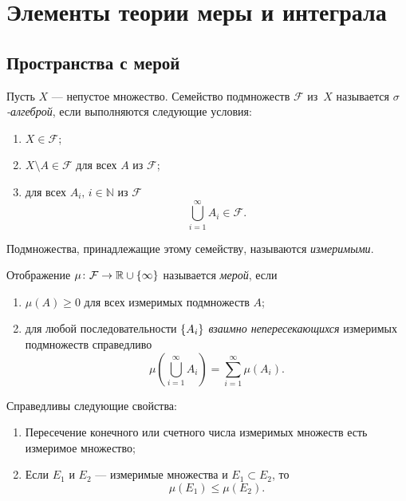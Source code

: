 \section{Элементы теории меры и интеграла}
\subsection{Пространства с мерой}

\begin{definition}
    Пусть $X$ --- непустое множество. Семейство подмножеств $\mathcal{F}$ из~$X$ называется
    \emph{$\sigma$-алгеброй}, если выполняются следующие условия:
    \begin{enumerate}
        \item $X \in \mathcal F$;
        \item $X \setminus A \in \mathcal F$ для всех $A$ из $\mathcal F$;
        \item для всех $A_i, \, i
            \in \mathbb N$ из $\mathcal F$ 
            \[\bigcup\limits_{i=1}^\infty A_i \in \mathcal F.\]
    \end{enumerate}

    Подмножества, принадлежащие этому семейству, называются \emph{измеримыми}.
\end{definition}

\begin{definition}
    Отображение $\mu \colon \mathcal F \to \mathbb{R} \cup \left\{\infty\right\}$
    называется \emph{мерой}, если
    \begin{enumerate}
        \item $\mu(A) \geq 0$ для всех измеримых подмножеств $A$;
        \item для любой последовательности
            $\left\{A_i\right\}$ \emph{взаимно непересекающихся} измеримых подмножеств
            справедливо
            \[ \mu\left(\bigcup\limits_{i=1}^\infty A_i\right) =
            \sum\limits_{i=1}^\infty \mu(A_i). \]
    \end{enumerate}
\end{definition}

\begin{theorem}
    Справедливы следующие свойства:
    \begin{enumerate}
        \item Пересечение конечного или счетного числа измеримых
            множеств есть измеримое множество;
        \item Если $E_1$ и $E_2$ --- измеримые множества и $E_1 \subset E_2$,
            то 
            \[ \mu(E_1) \leq \mu(E_2). \]
    \end{enumerate}
\end{theorem}

